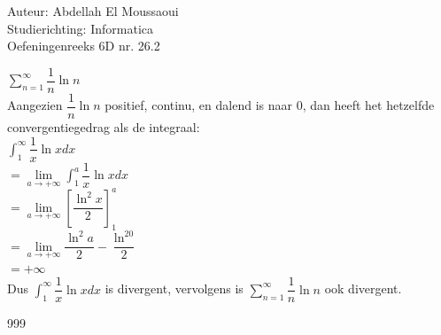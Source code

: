 \documentclass[a4paper]{article}
\begin{document}
  
\noindent \large Auteur: Abdellah El Moussaoui \\
\noindent \large Studierichting: Informatica\\
\noindent \large Oefeningenreeks 6D nr. 26.2\\

\medskip

\normalsize


$\displaystyle\sum_{n=1}^{\infty}\dfrac{1}{n}\ln{n}$\\

Aangezien $\dfrac{1}{n}\ln{n}$ positief, continu, en dalend is naar 0, dan heeft het hetzelfde convergentiegedrag als de integraal:\\

$\displaystyle\int^\infty_1\dfrac{1}{x}\ln{x}dx$\\

$ = \lim\limits_{a\to+\infty} \displaystyle\int^a_1\dfrac{1}{x}\ln{x}dx$\\

$ = \lim\limits_{a\to+\infty} \left[\dfrac{\ln^2x}{2}\right]^a_1$\\

$ = \lim\limits_{a\to+\infty} \dfrac{\ln^2a}{2} - \dfrac{\ln^20}{2}$\\

$ = +\infty$\\

Dus $\displaystyle\int^\infty_1\dfrac{1}{x}\ln{x}dx$ is divergent, vervolgens is $\displaystyle\sum_{n=1}^{\infty}\dfrac{1}{n}\ln{n}$ ook divergent.




\begin{thebibliography}{999}
\end{thebibliography}
\end{document}
